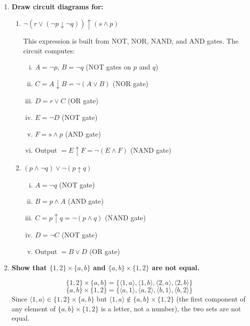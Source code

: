 \documentclass[11pt]{book}
\begin{document}
\begin{enumerate}[{0.}1. ]
\item \textbf{Draw circuit diagrams for:}

\begin{enumerate}
\item $\neg(r \vee (\neg p \downarrow \neg q)) \uparrow (s \wedge p)$

This expression is built from NOT, NOR, NAND, and AND gates. The circuit computes:
\begin{enumerate}[i.]
  \item $A = \neg p$, $B = \neg q$ (NOT gates on $p$ and $q$)
  \item $C = A \downarrow B = \neg(A \vee B)$ (NOR gate)
  \item $D = r \vee C$ (OR gate)
  \item $E = \neg D$ (NOT gate)
  \item $F = s \wedge p$ (AND gate)
  \item Output $= E \uparrow F = \neg(E \wedge F)$ (NAND gate)
\end{enumerate}

\item $(p \wedge \neg q) \vee \neg(p \uparrow q)$

\begin{enumerate}[i.]
  \item $A = \neg q$ (NOT gate)
  \item $B = p \wedge A$ (AND gate)
  \item $C = p \uparrow q = \neg(p\wedge q)$ (NAND gate)
  \item $D = \neg C$ (NOT gate)
  \item Output $= B \vee D$ (OR gate)
\end{enumerate}
\end{enumerate}

\item \textbf{Show that $\{1,2\}\times\{a,b\}$ and $\{a,b\}\times\{1,2\}$ are not equal.}

\[
\{1,2\}\times\{a,b\} = \{\langle 1,a\rangle,\langle 1,b\rangle,\langle 2,a\rangle,\langle 2,b\rangle\}
\]
\[
\{a,b\}\times\{1,2\} = \{\langle a,1\rangle,\langle a,2\rangle,\langle b,1\rangle,\langle b,2\rangle\}
\]
Since $\langle 1,a\rangle \in \{1,2\}\times\{a,b\}$ but $\langle 1,a\rangle \notin \{a,b\}\times\{1,2\}$ (the first component of any element of $\{a,b\}\times\{1,2\}$ is a letter, not a number), the two sets are not equal.


\end{enumerate}
\end{document}
